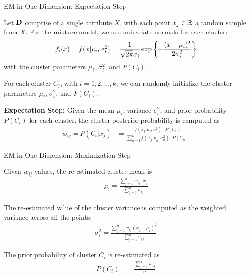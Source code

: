 \begin{frame}{EM in One Dimension: Expectation Step}

Let $\mathbf{D}$ comprise of a single attribute $X$,
with each point $x_{j} \in {\mathord{\mathbb R}}$ a random
sample from $X$. 
For the mixture model, we use univariate normals for each
cluster:
\begin{align*}
  f_i(x) = f(x | \mu_i, \sigma_i^2) =
  \frac{1}{\sqrt{2\pi}\sigma_i} \exp \left\{-\frac{(x -
  \mu_i)^2}{2\sigma_i^2} \right \}
\end{align*}
with the cluster parameters $\mu_{i}$, $\sigma_{i}^2$, and
$P(C_i)$.  


For each cluster $C_{i}$, with $i =
1,2,\ldots, k$, we can randomly initialize the cluster parameters
$\mu_{i}$, $\sigma_{i}^2$, and $P(C_i)$. 

\medskip
{\bf Expectation Step:}
Given 
the mean
$\mu_i$, variance $\sigma_i^2$, and prior probability $P(C_i)$ for each
cluster, the cluster posterior probability is computed as
\begin{align*}
  w_{ij} = P(C_{i}|x_{j}) & =
    \frac{f(x_{j}|\mu_i,\sigma_i^2) \cdot P(C_{i})}
    {\sum_{a=1}^k f(x_{j} |\mu_a, \sigma_a^2) \cdot P(C_{a})}
\end{align*}
\end{frame}



\begin{frame}{EM in One Dimension: Maximization Step}

Given $w_{ij}$ values, the re-estimated cluster mean is
\begin{align*}
    \mu_{i} = \frac{\sum_{j=1}^n w_{ij} \cdot x_{j}}
    {\sum_{j=1}^n w_{ij}}
\end{align*}

\smallskip
The re-estimated value of the cluster variance is computed as the
weighted variance across all the points:
\begin{align*}
\sigma_{i}^{2} =
    \frac{\sum_{j=1}^n w_{ij}(x_{j}-\mu_{i})^2}
        {\sum_{j=1}^n w_{ij}}
\end{align*}

\smallskip
The prior probability of cluster $C_i$ is re-estimated as
\begin{align*}
P(C_{i}) & =
    \frac{\sum_{j=1}^n w_{ij}}{n}
\end{align*}
\end{frame}


